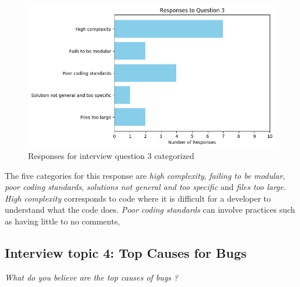 \documentclass[../main.tex]{subfiles}
\begin{document}
\begin{figure}[H]
    \centering
    \includegraphics[scale=0.7]{images/Results/RQ2/RQ2_question_3.png}
    \caption{Responses for interview question 3 categorized}
    \label{fig:rq4Image3}
\end{figure}

The five categories for this response are \textit{high complexity}, \textit{failing to be modular}, \textit{poor coding standards}, \textit{solutions not general and too specific} and \textit{files too large}. \textit{High complexity} corresponds to code where it is difficult for a developer to understand what the code does. \textit{Poor coding standards} can involve practices such as having little to no comments, 

\subsection{Interview topic 4: Top Causes for Bugs}

\textit{What do you believe are the top causes of bugs ? }
\end{document}
